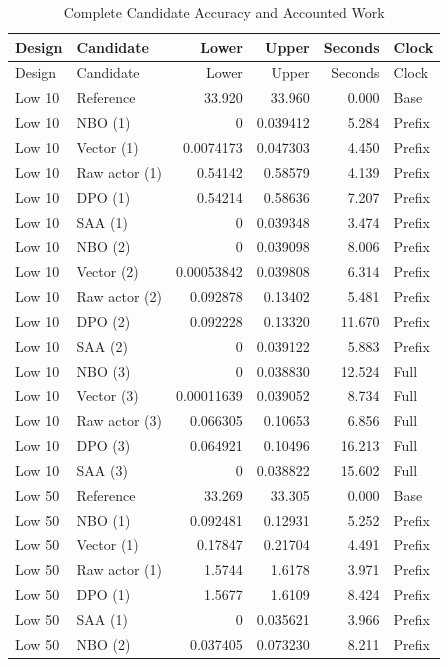 \small
\begin{longtable}{llrrrl}
\caption{Complete Candidate Accuracy and Accounted Work}\label{tab:r18complete}\\
\toprule Design & Candidate & Lower & Upper & Seconds & Clock\\\midrule\endfirsthead
\toprule Design & Candidate & Lower & Upper & Seconds & Clock\\\midrule\endhead
\bottomrule\endfoot
Low 10 & Reference & 33.920 & 33.960 & 0.000 & Base\\
Low 10 & NBO (1) & 0 & 0.039412 & 5.284 & Prefix\\
Low 10 & Vector (1) & 0.0074173 & 0.047303 & 4.450 & Prefix\\
Low 10 & Raw actor (1) & 0.54142 & 0.58579 & 4.139 & Prefix\\
Low 10 & DPO (1) & 0.54214 & 0.58636 & 7.207 & Prefix\\
Low 10 & SAA (1) & 0 & 0.039348 & 3.474 & Prefix\\
Low 10 & NBO (2) & 0 & 0.039098 & 8.006 & Prefix\\
Low 10 & Vector (2) & 0.00053842 & 0.039808 & 6.314 & Prefix\\
Low 10 & Raw actor (2) & 0.092878 & 0.13402 & 5.481 & Prefix\\
Low 10 & DPO (2) & 0.092228 & 0.13320 & 11.670 & Prefix\\
Low 10 & SAA (2) & 0 & 0.039122 & 5.883 & Prefix\\
Low 10 & NBO (3) & 0 & 0.038830 & 12.524 & Full\\
Low 10 & Vector (3) & 0.00011639 & 0.039052 & 8.734 & Full\\
Low 10 & Raw actor (3) & 0.066305 & 0.10653 & 6.856 & Full\\
Low 10 & DPO (3) & 0.064921 & 0.10496 & 16.213 & Full\\
Low 10 & SAA (3) & 0 & 0.038822 & 15.602 & Full\\
\addlinespace
Low 50 & Reference & 33.269 & 33.305 & 0.000 & Base\\
Low 50 & NBO (1) & 0.092481 & 0.12931 & 5.252 & Prefix\\
Low 50 & Vector (1) & 0.17847 & 0.21704 & 4.491 & Prefix\\
Low 50 & Raw actor (1) & 1.5744 & 1.6178 & 3.971 & Prefix\\
Low 50 & DPO (1) & 1.5677 & 1.6109 & 8.424 & Prefix\\
Low 50 & SAA (1) & 0 & 0.035621 & 3.966 & Prefix\\
Low 50 & NBO (2) & 0.037405 & 0.073230 & 8.211 & Prefix\\

\end{longtable}
